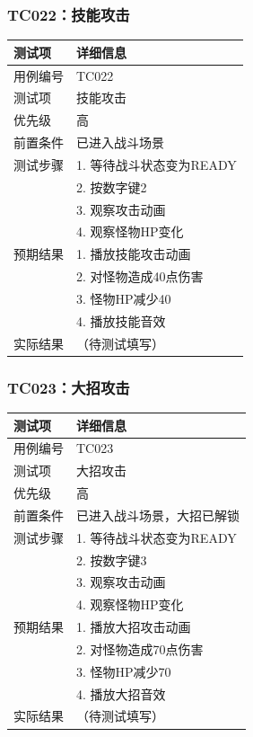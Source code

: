 \documentclass[a4paper,12pt]{article}
\begin{document}
\subsubsection{TC022：技能攻击}
\begin{table}[h]
\centering
\begin{tabular}{ll}
\toprule
测试项 & 详细信息 \\
\midrule
用例编号 & TC022 \\
测试项 & 技能攻击 \\
优先级 & 高 \\
前置条件 & 已进入战斗场景 \\
测试步骤 & 1. 等待战斗状态变为READY \\
 & 2. 按数字键2 \\
 & 3. 观察攻击动画 \\
 & 4. 观察怪物HP变化 \\
预期结果 & 1. 播放技能攻击动画 \\
 & 2. 对怪物造成40点伤害 \\
 & 3. 怪物HP减少40 \\
 & 4. 播放技能音效 \\
实际结果 & （待测试填写） \\
\bottomrule
\end{tabular}
\end{table}

\subsubsection{TC023：大招攻击}
\begin{table}[h]
\centering
\begin{tabular}{ll}
\toprule
测试项 & 详细信息 \\
\midrule
用例编号 & TC023 \\
测试项 & 大招攻击 \\
优先级 & 高 \\
前置条件 & 已进入战斗场景，大招已解锁 \\
测试步骤 & 1. 等待战斗状态变为READY \\
 & 2. 按数字键3 \\
 & 3. 观察攻击动画 \\
 & 4. 观察怪物HP变化 \\
预期结果 & 1. 播放大招攻击动画 \\
 & 2. 对怪物造成70点伤害 \\
 & 3. 怪物HP减少70 \\
 & 4. 播放大招音效 \\
实际结果 & （待测试填写） \\
\bottomrule
\end{tabular}
\end{table}
\end{document}
